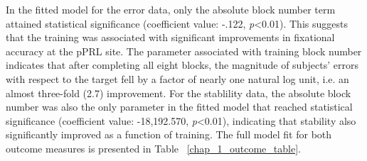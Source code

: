 In the fitted model for the error data, only the absolute block number term attained statistical significance (coefficient value: -.122, \textit{p}\textrm{\textless0.01}). This suggests that the training was associated with significant improvements in fixational accuracy at the pPRL site. The parameter associated with training block number indicates that after completing all eight blocks, the magnitude of subjects' errors with respect to the target fell by a factor of nearly one natural log unit, i.e. an almost three-fold (2.7) improvement. For the stablility data, the absolute block number was also the only parameter in the fitted model that reached statistical significance (coefficient value: -18,192.570, \textit{p}\textrm{\textless0.01}), indicating that stability also significantly improved as a function of training. The full model fit for both outcome measures is presented in Table ~\ref{chap_1_outcome_table}.

\begin{table}[!htbp] \centering
{} 
\end{table} 

